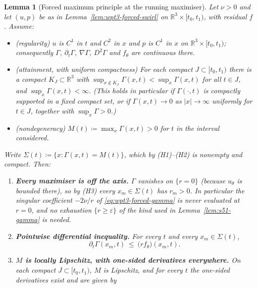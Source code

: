 \documentclass[11pt]{article}
\newtheorem{lemma}[theorem]{Lemma}
\theoremstyle{definition}
\theoremstyle{remark}
\newcommand{\R}{\mathbb{R}}
\newcommand{\abs}[1]{\left|#1\right|}
\newcommand{\grad}{\nabla}
\newcommand{\eps}{\varepsilon}
\begin{document}
\begin{lemma}[Forced maximum principle at the running maximiser]
  \label{lem:wpt3-forced-max}
  Let $\nu>0$ and let $(u,p)$ be as in Lemma~\ref{lem:wpt3-forced-swirl} on
  $\R^3\times[t_0,t_1)$, with residual $f$. Assume:
  \begin{itemize}[leftmargin=2.6em]
    \item[\textbf{(H1)}] \emph{(regularity)} $u$ is $C^1$ in $t$ and $C^2$ in
      $x$ and $p$ is $C^1$ in $x$ on $\R^3\times[t_0,t_1)$; consequently
      $\Gamma$, $\partial_t\Gamma$, $\grad\Gamma$, $D^2\Gamma$ and $f_\theta$
      are continuous there.
    \item[\textbf{(H2)}] \emph{(attainment, with uniform compactness)} For
      each compact $J\subset[t_0,t_1)$ there is a compact $K_J\subset\R^3$
      with
      $\sup_{x\notin K_J}\Gamma(x,t)<\sup_{x}\Gamma(x,t)$ for all $t\in J$,
      and $\sup_x\Gamma(x,t)<\infty$. (This holds in particular if
      $\Gamma(\cdot,t)$ is compactly supported in a fixed compact set, or if
      $\Gamma(x,t)\to0$ as $\abs x\to\infty$ uniformly for $t\in J$, together
      with $\sup_x\Gamma>0$.)
    \item[\textbf{(H3)}] \emph{(nondegeneracy)}
      $M(t)\coloneqq\max_x\Gamma(x,t)>0$ for $t$ in the interval considered.
  \end{itemize}
  Write $\Sigma(t)\coloneqq\{x:\Gamma(x,t)=M(t)\}$, which by (H1)--(H2) is
  nonempty and compact. Then:
  \begin{enumerate}[label=\textup{(\roman*)},leftmargin=2.6em]
    \item \textbf{Every maximiser is off the axis.} $\Gamma$ vanishes on
      $\{r=0\}$ (because $u_\theta$ is bounded there), so by (H3) every
      $x_m\in\Sigma(t)$ has $r_m>0$. In particular the singular coefficient
      $-2\nu/r$ of \eqref{eq:wpt3-forced-gamma} is never evaluated at $r=0$,
      and \emph{no} exhaustion $\{r\geq\eps\}$ of the kind used in
      Lemma~\ref{lem:s51-gamma} is needed.
    \item \textbf{Pointwise differential inequality.} For every $t$ and every
      $x_m\in\Sigma(t)$,
      \begin{equation}\label{eq:wpt3-pointwise}
        \partial_t\Gamma(x_m,t)\ \leq\ \bigl(rf_\theta\bigr)(x_m,t).
      \end{equation}
    \item \textbf{$M$ is locally Lipschitz, with one-sided derivatives
      everywhere.} On each compact $J\subset[t_0,t_1)$, $M$ is Lipschitz, and
      for every $t$ the one-sided derivatives exist and are given by

\end{enumerate}
\end{lemma}
\end{document}
